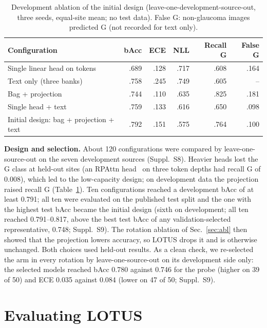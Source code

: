 \documentclass[runningheads]{llncs}
\newcommand{\sups}[1]{Suppl.~S#1}
\begin{document}
\begin{table}[tb]
\caption{Development ablation of the initial design (leave-one-development-source-out, three seeds, equal-site mean; no test data). False G: non-glaucoma images predicted G (not recorded for text only).}\label{tab:abl}
\centering\scriptsize
\begin{tabular}{@{}lrrrrr@{}}
\toprule
Configuration & bAcc & ECE & NLL & Recall G & False G\\
\midrule
Single linear head on tokens & .689 & .128 & .717 & .608 & .164\\
Text only (three banks) & .758 & .245 & .749 & .605 & --\\
Bag + projection & .744 & .110 & .635 & .825 & .181\\
Single head + text & .759 & .133 & .616 & .650 & .098\\
Initial design: bag + projection + text & .792 & .151 & .575 & .764 & .100\\
\bottomrule
\end{tabular}
\end{table}

\textbf{Design and selection.} About 120 configurations were compared by leave-one-source-out on the seven development sources (\sups{8}). Heavier heads lost the G class at held-out sites (an RPAttn head~\cite{rpattn} on three token depths had recall G of 0.008), which led to the low-capacity design; on development data the projection raised recall G (Table~\ref{tab:abl}). Ten configurations reached a development bAcc of at least 0.791; all ten were evaluated on the published test split and the one with the highest test bAcc became the initial design (sixth on development; all ten reached 0.791--0.817, above the best test bAcc of any validation-selected representative, 0.748; \sups{9}). The rotation ablation of Sec.~\ref{sec:abl} then showed that the projection lowers accuracy, so LOTUS drops it and is otherwise unchanged. Both choices used held-out results. As a clean check, we re-selected the arm in every rotation by leave-one-source-out on its development side only: the selected models reached bAcc 0.780 against 0.746 for the probe (higher on 39 of 50) and ECE 0.035 against 0.084 (lower on 47 of 50; \sups{9}).

\section{Evaluating LOTUS}\label{sec:eval}
\end{document}
